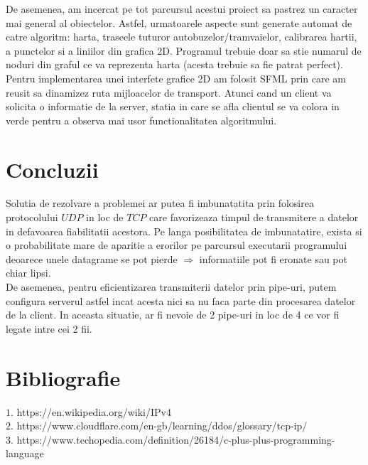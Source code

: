 \documentclass{llncs}
\begin{document}
\vspace{4mm}

De asemenea, am incercat pe tot parcursul acestui proiect sa pastrez un caracter mai general al obiectelor. Astfel, urmatoarele aspecte sunt generate automat de catre algoritm: harta, traseele tuturor autobuzelor/tramvaielor, calibrarea hartii, a punctelor si a liniilor din grafica 2D. Programul trebuie doar sa stie numarul de noduri din graful ce va reprezenta harta (acesta trebuie sa fie patrat perfect). \\
\hspace*{4mm} Pentru implementarea unei interfete grafice 2D am folosit SFML prin care am reusit sa dinamizez ruta mijloacelor de transport. Atunci cand un client va solicita o informatie de la server, statia in care se afla clientul se va colora in verde pentru a observa mai usor functionalitatea algoritmului.

\section{Concluzii}
\hspace*{4mm} Solutia de rezolvare a problemei ar putea fi imbunatatita prin folosirea protocolului $UDP$ in loc de $TCP$ care favorizeaza timpul de transmitere a datelor in defavoarea fiabilitatii acestora. Pe langa posibilitatea de imbunatatire, exista si o probabilitate mare de aparitie a erorilor pe parcursul executarii programului deoarece unele datagrame se pot pierde $\Rightarrow$ informatiile pot fi eronate sau pot chiar lipsi. \\
\hspace*{4mm} De asemenea, pentru eficientizarea transmiterii datelor prin pipe-uri, putem configura serverul astfel incat acesta nici sa nu faca parte din procesarea datelor de la client. In aceasta situatie, ar fi nevoie de 2 pipe-uri in loc de 4 ce vor fi legate intre cei 2 fii.

\section{Bibliografie}
$1.$ https://en.wikipedia.org/wiki/IPv4  \\
$2.$ https://www.cloudflare.com/en-gb/learning/ddos/glossary/tcp-ip/ \\
$3.$ https://www.techopedia.com/definition/26184/c-plus-plus-programming-language
\end{document}
